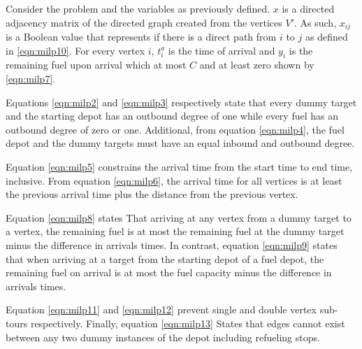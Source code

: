 


Consider the problem and the variables as previously defined. $x$ is a directed adjacency matrix of the directed graph created from the vertices $V'$. As such, $x_{ij}$ is a Boolean value that represents if there is a direct path from $i$ to $j$ as defined in \eqref{eqn:milp10}. For every vertex $i$, $t^a_i$ is the time of arrival and $y_i$ is the remaining fuel upon arrival which at most $C$ and at least zero shown by \eqref{eqn:milp7}. 

Equations \eqref{eqn:milp2} and \eqref{eqn:milp3} respectively state that every dummy target and the starting depot has an outbound degree of one while every fuel has an outbound degree of zero or one. Additional, from equation \eqref{eqn:milp4}, the fuel depot and the dummy targets must have an equal inbound and outbound degree.  

Equation \eqref{eqn:milp5} constrains the arrival time from the start time to end time, inclusive. From equation \eqref{eqn:milp6}, the arrival time for all vertices is at least the previous arrival time plus the distance from the previous vertex.

Equation \eqref{eqn:milp8} states That arriving at any vertex from a dummy target to a vertex, the remaining fuel is at most the remaining fuel at the dummy target minus the difference in arrivals times. In contrast, equation \eqref{eqn:milp9} states that when arriving at a target from the starting depot of a fuel depot, the remaining fuel on arrival is at most the fuel capacity minus the difference in arrivals times. 

Equation \eqref{eqn:milp11} and \eqref{eqn:milp12} prevent single and double vertex sub-tours respectively. Finally, equation \eqref{eqn:milp13} States that edges cannot exist between any two dummy instances of the depot including refueling stops.
